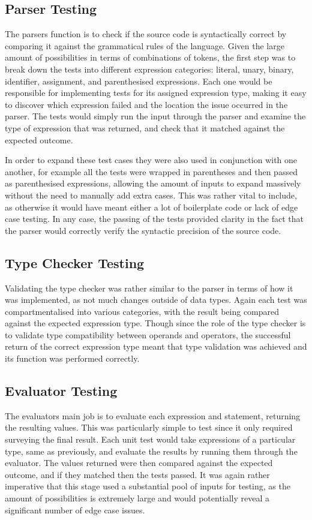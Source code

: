 \documentclass[
]{report}
\begin{document}
\subsection{Parser Testing}
The parsers function is to check if the source code is syntactically
correct by comparing it against the grammatical rules of the language.
Given the large amount of possibilities in terms of combinations of
\glspl{token}, the first step was to break down the tests into different
\gls{expression} categories: literal, unary, binary, \gls{identifier}, assignment,
and parenthesised \glspl{expression}. Each one would be responsible for
implementing tests for its assigned \gls{expression} type, making it easy to
discover which \gls{expression} failed and the location the issue occurred in
the parser. The tests would simply run the input through the parser and
examine the type of \gls{expression} that was returned, and check that it
matched against the expected outcome.

In order to expand these test cases they were also used in conjunction
with one another, for example all the tests were wrapped in parentheses
and then passed as parenthesised \glspl{expression}, allowing the amount of
inputs to expand massively without the need to manually add extra cases.
This was rather vital to include, as otherwise it would have meant
either a lot of boilerplate code or lack of edge case testing. In any
case, the passing of the tests provided clarity in the fact that the
parser would correctly verify the syntactic precision of the source
code.

\subsection{Type Checker Testing}
Validating the type checker was rather similar to the parser in terms of
how it was implemented, as not much changes outside of data types. Again
each test was compartmentalised into various categories, with the result
being compared against the expected \gls{expression} type. Though since the
role of the type checker is to validate type compatibility between
operands and operators, the successful return of the correct \gls{expression}
type meant that type validation was achieved and its function was
performed correctly.

\subsection{Evaluator Testing}
The evaluators main job is to evaluate each \gls{expression} and \gls{statement},
returning the resulting values. This was particularly simple to test
since it only required surveying the final result. Each unit test would
take \glspl{expression} of a particular type, same as previously, and evaluate
the results by running them through the evaluator. The values returned
were then compared against the expected outcome, and if they matched
then the tests passed. It was again rather imperative that this stage
used a substantial pool of inputs for testing, as the amount of
possibilities is extremely large and would potentially reveal a
significant number of edge case issues.
\end{document}

